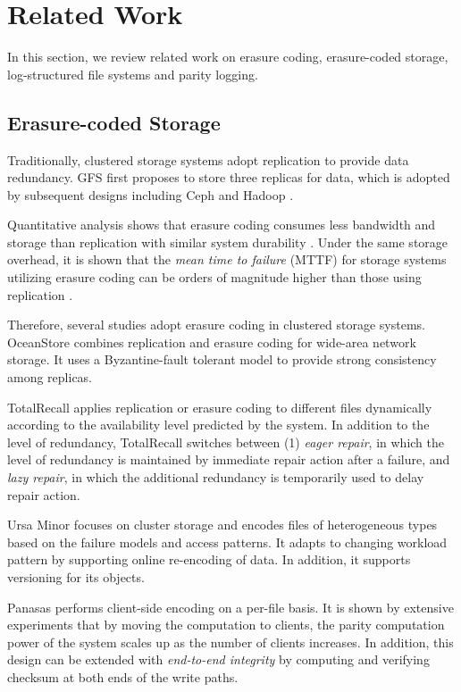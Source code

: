 \section{Related Work}
\label{chap:relatedwork}

In this section, we review related work on erasure coding, erasure-coded
storage, log-structured file systems and parity logging.

\subsection{Erasure-coded Storage}

Traditionally, clustered storage systems adopt replication to provide data
redundancy. GFS \cite{ghemawat03} first proposes to store three replicas for
data, which is adopted by subsequent designs including Ceph \cite{weil06} and
Hadoop \cite{shvachko10}.

Quantitative analysis shows that erasure coding consumes less bandwidth and
storage than replication with similar system durability
\cite{weatherspoon02,rodrigues05}. Under the same storage overhead, it is shown
that the \textit{mean time to failure} (MTTF) for storage systems utilizing
erasure coding can be orders of magnitude higher than those using replication
\cite{weatherspoon02}.

Therefore, several studies adopt erasure coding in clustered storage systems.
OceanStore \cite{kubiatowicz00,rhea03} combines replication and erasure coding
for wide-area network storage.  It uses a Byzantine-fault tolerant model to
provide strong consistency among replicas.

TotalRecall \cite{bhagwan04} applies replication or erasure coding to different
files dynamically according to the availability level predicted by the system.
In addition to the level of redundancy, TotalRecall switches between (1)
\textit{eager repair}, in which the level of redundancy is maintained by
immediate repair action after a failure, and \textit{lazy repair}, in which the
additional redundancy is temporarily used to delay repair action.

Ursa Minor \cite{abd05} focuses on cluster storage and encodes files of
heterogeneous types based on the failure models and access patterns. It adapts
to changing workload pattern by supporting online re-encoding of data. In
addition, it supports versioning for its objects.

Panasas \cite{welch08} performs client-side encoding on a per-file basis. It is
shown by extensive experiments that by moving the computation to clients, the
parity computation power of the system scales up as the number of clients
increases. In addition, this design can be extended with \textit{end-to-end
    integrity} by computing and verifying checksum at both ends of the write
paths.

